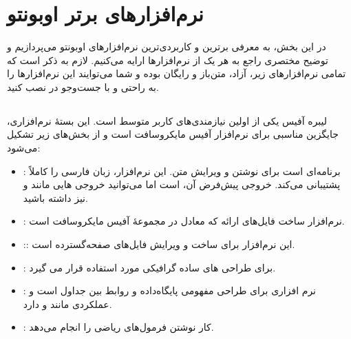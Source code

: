 \chapter{نرم‌افزارهای برتر اوبونتو}
در این بخش، به معرفی برترین و کاربردی‌ترین نرم‌افزارهای اوبونتو می‌پردازیم و توضیح مختصری راجع به هر یک از نرم‌افزارها ارایه می‌کنیم. لازم به ذکر است که تمامی نرم‌افزارهای زیر، آزاد، متن‌باز و رایگان بوده و شما می‌توایند این نرم‌افزارها را به راحتی و با جست‌و‌جو در  نصب کنید.

\section[libreOffice]{}
لیبره آفیس یکی از اولین نیازمندی‌های کاربر متوسط است. این بستهٔ نرم‌افزاری، جایگزین مناسبی برای نرم‌افزار آفیس مایکروسافت است و از بخش‌های زیر تشکیل می‌شود:
\begin{itemize}
\item {}: برنامه‌ای است برای نوشتن و ویرایش متن. این نرم‌افزار، زبان فارسی را کاملاً پشتیبانی می‌کند. خروجی پیش‌فرض آن،  است اما می‌توانید خروجی هایی مانند  و  نیز داشته باشید.
\item {}: نرم‌افزار ساخت فایل‌های ارائه که معادل  در مجموعهٔ آفیس مایکروسافت است.
\item {}:: این نرم‌افزار برای ساخت و ویرایش فایل‌های صفحه‌گسترده است.
\item {}: برای طراحی های ساده گرافیکی مورد استفاده قرار می گیرد.
\item {}: نرم افزاری برای طراحی مفهومی پایگاه‌داده و روابط بین جداول است و عملکردی مانند  و  دارد.
\item {}: کار نوشتن فرمول‌های ریاضی را انجام می‌دهد.
\end{itemize}


